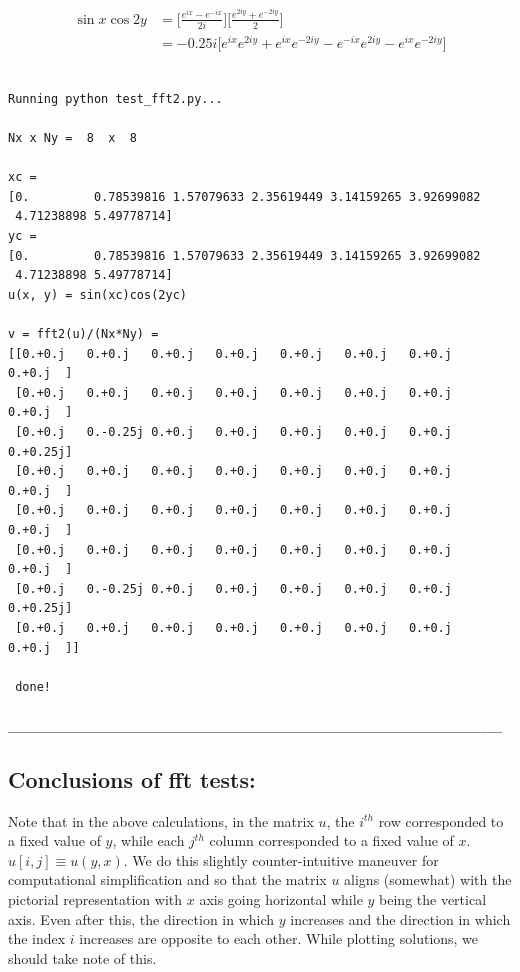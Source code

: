 \documentclass{article}
\begin{document}
\begin{align*}
 \sin {x} \cos{2y} &= \big[\frac{e^{ix} - e^{-ix}}{2i}\big]\big[ \frac{e^{2iy} + e^{-2iy}}{2}\big]\\
                  &= -0.25 i \big[e^{ix}e^{2iy} + e^{ix}e^{-2iy} - e^{-ix}e^{2iy} - e^{ix}e^{-2iy}\big]
\end{align*}
\begin{verbatim}
 
Running python test_fft2.py... 

Nx x Ny =  8  x  8 

xc = 
[0.         0.78539816 1.57079633 2.35619449 3.14159265 3.92699082
 4.71238898 5.49778714]
yc = 
[0.         0.78539816 1.57079633 2.35619449 3.14159265 3.92699082
 4.71238898 5.49778714]
u(x, y) = sin(xc)cos(2yc) 

v = fft2(u)/(Nx*Ny) = 
[[0.+0.j   0.+0.j   0.+0.j   0.+0.j   0.+0.j   0.+0.j   0.+0.j   0.+0.j  ]
 [0.+0.j   0.+0.j   0.+0.j   0.+0.j   0.+0.j   0.+0.j   0.+0.j   0.+0.j  ]
 [0.+0.j   0.-0.25j 0.+0.j   0.+0.j   0.+0.j   0.+0.j   0.+0.j   0.+0.25j]
 [0.+0.j   0.+0.j   0.+0.j   0.+0.j   0.+0.j   0.+0.j   0.+0.j   0.+0.j  ]
 [0.+0.j   0.+0.j   0.+0.j   0.+0.j   0.+0.j   0.+0.j   0.+0.j   0.+0.j  ]
 [0.+0.j   0.+0.j   0.+0.j   0.+0.j   0.+0.j   0.+0.j   0.+0.j   0.+0.j  ]
 [0.+0.j   0.-0.25j 0.+0.j   0.+0.j   0.+0.j   0.+0.j   0.+0.j   0.+0.25j]
 [0.+0.j   0.+0.j   0.+0.j   0.+0.j   0.+0.j   0.+0.j   0.+0.j   0.+0.j  ]]

 done!

_____________________________________________________________________
\end{verbatim}

\subsection{Conclusions of fft tests:}

Note that in the above calculations, in the matrix $u$, the $i^{th}$ row corresponded to a fixed value of $y$, while each $j^{th}$ column corresponded to a fixed value of $x$. $u[i, j]\equiv u(y, x)$. We do this slightly counter-intuitive maneuver for computational simplification and so that the matrix $u$ aligns (somewhat) with the pictorial representation with $x$ axis going horizontal while $y$ being the vertical axis. Even after this, the direction in which $y$ increases and the direction in which the index $i$ increases are opposite to each other. While plotting solutions, we should take note of this.    
\end{document}
